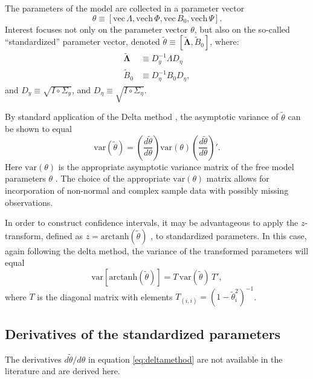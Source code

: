 \documentclass[a4paper, 11pt]{article}
\newcommand{\n}{\eta}
\newcommand{\definedas}{\equiv}
\newcommand{\hadaprod}{\circ}
\renewcommand{\vec}{\mathrm{vec}\,}
\newcommand{\vech}{\mathrm{vech}\,}
\newcommand{\Lambdastan}{\boldsymbol{\tilde{\Lambda}}}
\newcommand{\Bstan}{\tilde{B}}
\newcommand{\thetastan}{\tilde{\theta}}
\newcommand{\0}{\boldsymbol{0}}
\newcommand{\var}{\mathrm{var}}
\newcommand{\arctanh}{\mathrm{arctanh}}
\begin{document}
The parameters of the model are collected in a parameter
vector $$\theta \definedas [\vec{\Lambda}, \vech{\Phi}, \vec B_0, \vech
\Psi].$$
Interest focuses not only on the parameter vector $\theta$, 
but also on the so-called ``standardized'' parameter vector, denoted
$\thetastan \definedas [\Lambdastan, \Bstan_0]$, where:
\begin{align}\label{eq:lambda_s}
    \Lambdastan &\definedas D^{-1}_y \Lambda D_\n
    \\
    \Bstan_0 &\definedas D^{-1}_\n B_0 D_\n,\label{eq:beta_s}
\end{align}
and $D_y \definedas \sqrt{I \hadaprod \Sigma_y}$, and 
$D_\n \definedas \sqrt{I \hadaprod \Sigma_\n}$. 


By standard application of the Delta method \citep[e.g.][]{oehlert1992note}, the asymptotic variance of $\thetastan$ can be shown to equal
\begin{equation}\label{eq:deltamethod}
\var(\thetastan) = 
	\left(\frac{d \thetastan}{d \theta}\right) 
		\var(\theta) 
	\left(\frac{d \thetastan}{d \theta}\right)'.
\end{equation}
Here $\var(\theta)$ is the appropriate asymptotic variance matrix of the free model parameters $\theta$ \cite[e.g.][143-4]{satorra1989alternative}.
The choice of the appropriate $\var(\theta)$ matrix allows for incorporation of 
non-normal and complex sample data with possibly missing observations.

In order to construct confidence intervals, it may be advantageous to apply the 
$z$-transform, defined as $z = \arctanh(\thetastan)$  \citep[section 35]{fisher1925statistical}, to standardized parameters.
In this case, again following the delta method, the variance of the transformed parameters will equal
\begin{equation}\label{eq:deltamethod-ztransform}
\var[\arctanh(\thetastan)] = 
		T\,
		\var(\thetastan)\,
		T',
\end{equation}
where $T$ is the diagonal matrix with elements $T_{(i,i)} = (1 - \thetastan_i^2)^{-1}$.

\subsection{Derivatives of the standardized parameters}


The derivatives $d \thetastan / d \theta$ in equation \ref{eq:deltamethod} are not available in the literature and are derived here.
\end{document}

